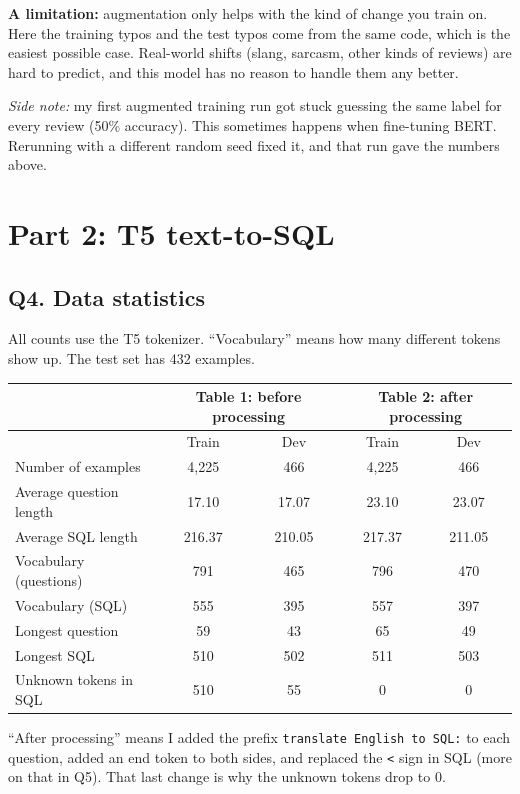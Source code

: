 \documentclass[11pt]{article}
\newcommand{\code}[1]{\texttt{#1}}
\begin{document}
\textbf{A limitation:} augmentation only helps with the kind of change you train on. Here the
training typos and the test typos come from the same code, which is the easiest possible case.
Real-world shifts (slang, sarcasm, other kinds of reviews) are hard to predict, and this model has
no reason to handle them any better.

\emph{Side note:} my first augmented training run got stuck guessing the same label for every
review (50\% accuracy). This sometimes happens when fine-tuning BERT. Rerunning with a different
random seed fixed it, and that run gave the numbers above.

\section*{Part 2: T5 text-to-SQL}

\subsection*{Q4. Data statistics}

All counts use the T5 tokenizer. ``Vocabulary'' means how many different tokens show up. The test
set has 432 examples.

\begin{table}[H]
\centering
\begin{tabular}{|l|c|c|c|c|}
\hline
 & \multicolumn{2}{c|}{Table 1: before processing} & \multicolumn{2}{c|}{Table 2: after processing} \\ \hline
 & Train & Dev & Train & Dev \\ \hline
Number of examples & 4,225 & 466 & 4,225 & 466 \\
Average question length & 17.10 & 17.07 & 23.10 & 23.07 \\
Average SQL length & 216.37 & 210.05 & 217.37 & 211.05 \\
Vocabulary (questions) & 791 & 465 & 796 & 470 \\
Vocabulary (SQL) & 555 & 395 & 557 & 397 \\
Longest question & 59 & 43 & 65 & 49 \\
Longest SQL & 510 & 502 & 511 & 503 \\
Unknown tokens in SQL & 510 & 55 & 0 & 0 \\ \hline
\end{tabular}
\end{table}

``After processing'' means I added the prefix \code{translate English to SQL:} to each question,
added an end token to both sides, and replaced the \code{<} sign in SQL (more on that in Q5). That
last change is why the unknown tokens drop to 0.
\end{document}
